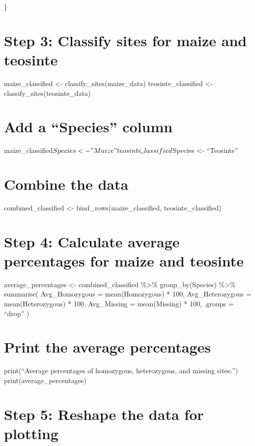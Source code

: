 \documentclass[
]{article}
\begin{document}
\}

\section{Step 3: Classify sites for maize and
teosinte}\label{step-3-classify-sites-for-maize-and-teosinte}

maize\_classified \textless- classify\_sites(maize\_data)
teosinte\_classified \textless- classify\_sites(teosinte\_data)

\section{Add a ``Species'' column}\label{add-a-species-column}

maize\_classified\(Species <- "Maize"
teosinte_classified\)Species \textless- ``Teosinte''

\section{Combine the data}\label{combine-the-data}

combined\_classified \textless- bind\_rows(maize\_classified,
teosinte\_classified)

\section{Step 4: Calculate average percentages for maize and
teosinte}\label{step-4-calculate-average-percentages-for-maize-and-teosinte}

average\_percentages \textless- combined\_classified \%\textgreater\%
group\_by(Species) \%\textgreater\% summarise( Avg\_Homozygous =
mean(Homozygous) * 100, Avg\_Heterozygous = mean(Heterozygous) * 100,
Avg\_Missing = mean(Missing) * 100, .groups = ``drop'' )

\section{Print the average
percentages}\label{print-the-average-percentages}

print(``Average percentages of homozygous, heterozygous, and missing
sites:'') print(average\_percentages)

\section{Step 5: Reshape the data for
plotting}\label{step-5-reshape-the-data-for-plotting}
\end{document}

